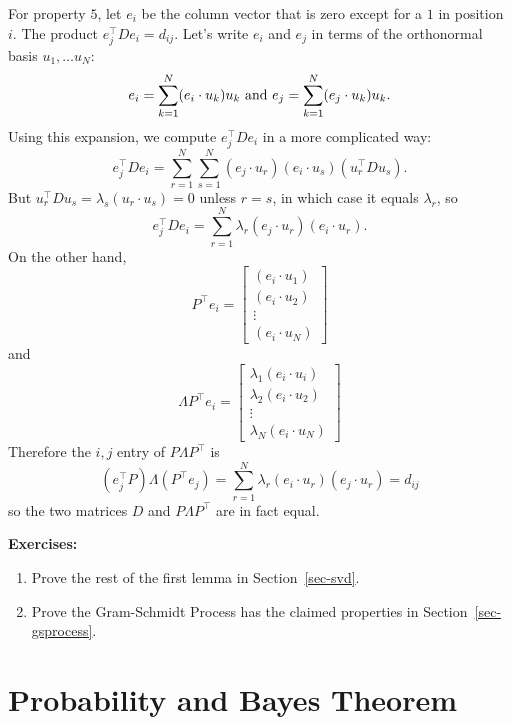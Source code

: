 \documentclass[
  11pt,
  letterpaper,
]{scrbook}
\theoremstyle{plain}
\theoremstyle{remark}
\begin{document}
For property \(5\), let \(e_{i}\) be the column vector that is zero
except for a \(1\) in position \(i\). The product
\(e_{j}^{\intercal}De_{i}=d_{ij}\). Let's write \(e_{i}\) and \(e_{j}\)
in terms of the orthonormal basis \(u_{1},\ldots u_{N}\): \[
e_{i} = \sum_{k=1}^{N} (e_{i}\cdot u_{k})u_k \hbox{ and } e_{j} = \sum_{k=1}^{N}(e_{j}\cdot u_{k})u_{k}.
\] Using this expansion, we compute \(e_{j}^{\intercal}De_{i}\) in a
more complicated way: \[
e_{j}^{\intercal}De_{i} = \sum_{r=1}^{N}\sum_{s=1}^{N} (e_{j}\cdot u_{r})(e_{i}\cdot u_{s})(u_{r}^{\intercal}Du_{s}).
\] But \(u_{r}^{\intercal}Du_{s}=\lambda_{s}(u_{r}\cdot u_{s})=0\)
unless \(r=s\), in which case it equals \(\lambda_{r}\), so \[
e_{j}^{\intercal}De_{i} = \sum_{r=1}^{N} \lambda_{r}(e_{j}\cdot u_{r})(e_{i}\cdot u_{r}).
\] On the other hand, \[
P^{\intercal}e_{i} = \left[\begin{matrix} (e_{i}\cdot u_{1})\\ (e_{i}\cdot u_{2})\\ \vdots \\(e_{i}\cdot u_{N})\end{matrix}\right]
\] and \[
\Lambda P^{\intercal}e_{i} = \left[\begin{matrix} \lambda_{1}(e_{i}\cdot u_{i})\\ \lambda_{2}(e_{i}\cdot u_{2})\\ \vdots \\ \lambda_{N}(e_{i}\cdot u_{N})\end{matrix}\right]
\] Therefore the \(i,j\) entry of \(P\Lambda P^{\intercal}\) is \[
(e_{j}^{\intercal}P)\Lambda (P^{\intercal}e_{j}) = \sum_{r=1}^{N} \lambda_{r}(e_{i}\cdot u_{r})(e_{j}\cdot u_{r}) = d_{ij}
\] so the two matrices \(D\) and \(P\Lambda P^{\intercal}\) are in fact
equal.

\textbf{Exercises:}

\begin{enumerate}
\def\labelenumi{\arabic{enumi}.}
\item
  Prove the rest of the first lemma in Section~\ref{sec-svd}.
\item
  Prove the Gram-Schmidt Process has the claimed properties in
  Section~\ref{sec-gsprocess}.
\end{enumerate}


\hypertarget{probability-and-bayes-theorem}{%
\chapter{Probability and Bayes
Theorem}\label{probability-and-bayes-theorem}}
\end{document}
